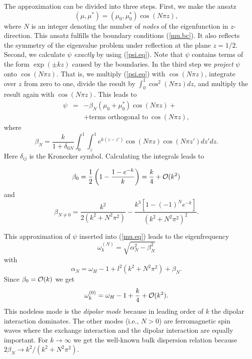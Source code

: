 The approximation can be divided into three steps. First, we make
the ansatz 
\begin{equation}
  (\mu,\mu^*)=(\mu_0,\mu^*_0)\cos(N\pi z),
  \label{mu.appr}
\end{equation}
where $N$ is an integer denoting the number of {\em nodes\/} of the
eigenfunction in $z$-direction. This ansatz fulfills the boundary
conditions (\ref{mu.bc}). It also reflects the symmetry of the
eigenvalue problem under reflection at the plane $z=1/2$. Second,
we calculate $\psi$ {\em exactly\/} by using (\ref{psi.eq}). Note
that $\psi$ contains terms of the form $\exp(\pm kz)$ caused by the
boundaries. In the third step we {\em project\/} $\psi$ onto $\cos
(N\pi z)$. That is, we multiply (\ref{psi.eq}) with $\cos(N\pi z)$,
integrate over $z$ from zero to one, divide the result by
$\int_0^1\cos^2(N\pi z)dz$, and multiply the result again
with $\cos(N\pi z)$. This leads to
\begin{eqnarray}
  \psi&=&-\beta_N(\mu_0+\mu^*_0)\cos(N\pi z)+\nonumber\\
   &&+\mbox{terms orthogonal to}\ \cos(N\pi z),
  \label{psi.appr}
\end{eqnarray}
where
\begin{equation}
  \beta_N=\frac{k}{1+\delta_{0N}}\int_0^1\int_z^1e^{k(z-z')}
   \cos(N\pi z)\cos(N\pi z')dz'dz.
  \label{beta}
\end{equation}
Here $\delta_{ij}$ is the Kronecker symbol. Calculating the integrals
leads to
\begin{mathletters}\label{beta0n}
\begin{equation}
  \beta_0=\frac{1}{2}\left(1-\frac{1-e^{-k}}{k}\right)=\frac{k}{4}
   +{\cal O}(k^2)
  \label{beta0}
\end{equation}
and
\begin{equation}
   \beta_{N\not=0}=\frac{k^2}{2(k^2+N^2\pi^2)}-\frac{k^3[1-(-1)^N
   e^{-k}]}{(k^2+N^2\pi^2)^2}.
  \label{betan}
\end{equation}
\end{mathletters}
This approximation of $\psi$ inserted into (\ref{mu.eq}) 
leads to the eigenfrequency
\begin{equation}
  \omega_k^{(N)}=\sqrt{\alpha_N^2-\beta_N^2}
  \label{wk.n}
\end{equation}
with
\begin{equation}
 \alpha_N=\omega_H-1+l^2(k^2+N^2\pi^2)+\beta_N.
  \label{alpha}
\end{equation}
Since $\beta_0={\cal O}(k)$ we get
\begin{equation}
  \omega_k^{(0)}=\omega_H-1+\frac{k}{4}+{\cal O}(k^2).
  \label{wk.0}
\end{equation}
This nodeless mode is the {\em dipolar mode\/} because in leading
order of $k$ the dipolar interaction dominates. The other modes
(i.e., $N>0$) are ferromagnetic spin waves where the exchange
interaction and the dipolar interaction are equally important. For
$k\to\infty$ we get the well-known bulk dispersion relation because
$2\beta_N\to k^2/ (k^2+N^2\pi^2)$.

